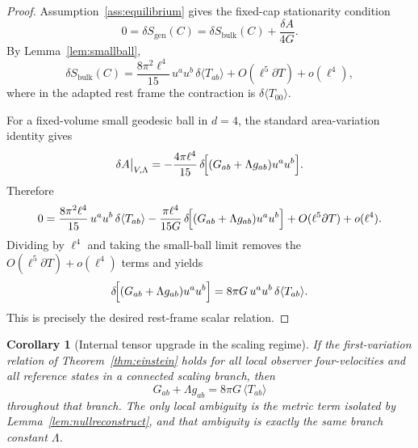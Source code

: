 \documentclass[11pt]{article}
\newtheorem{corollary}[theorem]{Corollary}
\begin{document}
\begin{proof}
Assumption~\ref{ass:equilibrium} gives the fixed-cap stationarity condition
\[
0=\delta S_{\mathrm{gen}}(C)
=
\delta S_{\mathrm{bulk}}(C)+\frac{\delta A}{4G}.
\]
By Lemma~\ref{lem:smallball},
\[
\delta S_{\mathrm{bulk}}(C)
=
\frac{8\pi^2\ell^4}{15}\,u^a u^b\,\delta\langle T_{ab}\rangle
+O(\ell^5\partial T)+o(\ell^4),
\]
where in the adapted rest frame the contraction is $\delta\langle T_{00}\rangle$.

For a fixed-volume small geodesic ball in $d=4$, the standard area-variation identity gives
\[
\delta A\big|_{V,\Lambda}
=
-\frac{4\pi\ell^4}{15}\,
\delta\!\Bigl[(G_{ab}+\Lambda g_{ab})u^a u^b\Bigr].
\]
Therefore
\[
0
=
\frac{8\pi^2\ell^4}{15}\,u^a u^b\,\delta\langle T_{ab}\rangle
-\frac{\pi\ell^4}{15G}\,
\delta\!\Bigl[(G_{ab}+\Lambda g_{ab})u^a u^b\Bigr]
+O(\ell^5\partial T)+o(\ell^4).
\]
Dividing by $\ell^4$ and taking the small-ball limit removes the $O(\ell^5\partial T)+o(\ell^4)$ terms and yields
\[
\delta\!\Bigl[(G_{ab}+\Lambda g_{ab})u^a u^b\Bigr]
=
8\pi G\,u^a u^b\,\delta\langle T_{ab}\rangle.
\]
This is precisely the desired rest-frame scalar relation.
\end{proof}

\begin{corollary}[Internal tensor upgrade in the scaling regime]\label{cor:einstein}
If the first-variation relation of Theorem~\ref{thm:einstein} holds for all local observer four-velocities and all reference states in a connected scaling branch, then
\[
G_{ab}+\Lambda g_{ab}=8\pi G\,\langle T_{ab}\rangle
\]
throughout that branch. The only local ambiguity is the metric term isolated by Lemma~\ref{lem:nullreconstruct}, and that ambiguity is exactly the same branch constant $\Lambda$.
\end{corollary}
\end{document}
